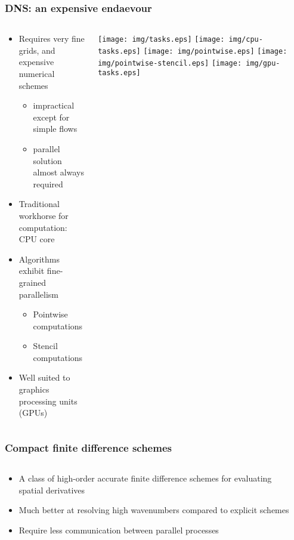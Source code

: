 \begin{frame}[t]
\frametitle{DNS: an expensive endaevour}
\pause
\begin{columns}[T]
\begin{column}{0.5\textwidth}
\begin{itemize}[<+->]
    \item Requires very fine grids,
        and expensive numerical schemes
        \begin{itemize}[<+->]
            \item impractical except for simple flows
            \item parallel solution almost always required
        \end{itemize}
    \item Traditional workhorse for computation: CPU core
    \item Algorithms exhibit fine-grained parallelism
        \begin{itemize}[<+->]
            \item Pointwise computations
            \item Stencil computations
        \end{itemize}
    \item Well suited to graphics processing units (GPUs)
\end{itemize}
\end{column}
\begin{column}{0.5\textwidth}
    \centering
     {\texttt{[image: img/tasks.eps]}}
     {\texttt{[image: img/cpu-tasks.eps]}}
     {\texttt{[image: img/pointwise.eps]}}
     {\texttt{[image: img/pointwise-stencil.eps]}}
     {\texttt{[image: img/gpu-tasks.eps]}}
\end{column}
\end{columns}
\end{frame}

\begin{frame}
\frametitle{Compact finite difference schemes}
\pause
\begin{columns}
\begin{column}{0.5\textwidth}
\begin{itemize}[<+->]
    \item A class of high-order accurate finite difference schemes
        for evaluating spatial derivatives
    \item Much better at resolving high wavenumbers compared
        to explicit schemes
    \item Require less communication between parallel processes
\end{itemize}
\end{column}
\begin{column}{0.5\textwidth}
\end{column}
\end{columns}
\end{frame}

